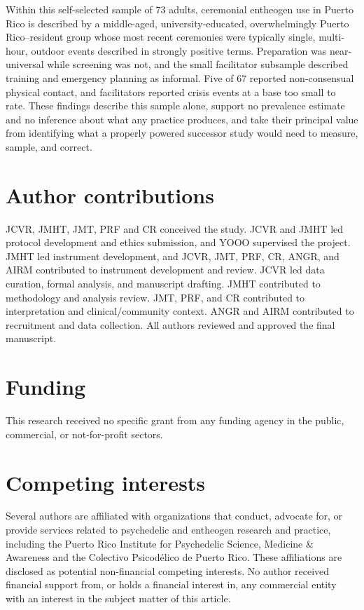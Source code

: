 \documentclass[12pt]{article}
\begin{document}
Within this self-selected sample of 73 adults, ceremonial entheogen use in Puerto Rico is described by a
middle-aged, university-educated, overwhelmingly Puerto Rico--resident group whose most recent ceremonies
were typically single, multi-hour, outdoor events described in strongly positive terms. Preparation was
near-universal while screening was not, and the small facilitator subsample described training and
emergency planning as informal. Five of 67 reported non-consensual physical contact, and facilitators
reported crisis events at a base too small to rate. These findings describe this sample alone, support no
prevalence estimate and no inference about what any practice produces, and take their principal value from
identifying what a properly powered successor study would need to measure, sample, and correct.

\section*{Author contributions}
JCVR, JMHT, JMT, PRF and CR conceived the study. JCVR and JMHT led protocol development and ethics
submission, and YOOO supervised the project. JMHT led instrument development, and JCVR, JMT, PRF, CR, ANGR,
and AIRM contributed to instrument development and review. JCVR led data curation, formal analysis, and
manuscript drafting. JMHT contributed to methodology and analysis review. JMT, PRF, and CR contributed to
interpretation and clinical/community context. ANGR and AIRM contributed to recruitment and data
collection. All authors reviewed and approved the final manuscript.

\section*{Funding}
This research received no specific grant from any funding agency in the public, commercial, or
not-for-profit sectors.

\section*{Competing interests}
Several authors are affiliated with organizations that conduct, advocate for, or provide services related
to psychedelic and entheogen research and practice, including the Puerto Rico Institute for Psychedelic
Science, Medicine \& Awareness and the Colectivo Psicod\'elico de Puerto Rico. These affiliations are
disclosed as potential non-financial competing interests. No author received financial support from, or
holds a financial interest in, any commercial entity with an interest in the subject matter of this
article.
\end{document}
